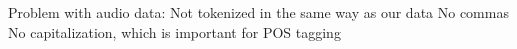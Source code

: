
Problem with audio data:
Not tokenized in the same way as our data
No commas
No capitalization, which is important for POS tagging
